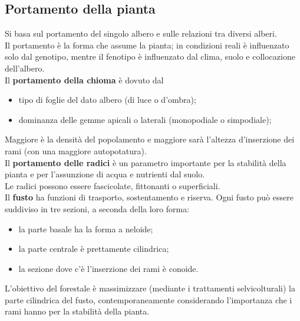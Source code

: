 \documentclass{article}
\begin{document}
\subsection{Portamento della pianta}
Si basa sul portamento del singolo albero e sulle relazioni tra diversi alberi.\\
Il portamento è la forma che assume la pianta; in condizioni reali è influenzato solo dal genotipo, mentre il fenotipo è influenzato dal clima, suolo e collocazione dell'albero.\\
Il \textbf{portamento della chioma} è dovuto dal 
\begin{itemize}
    \item tipo di foglie del dato albero (di luce o d'ombra);
    \item dominanza delle gemme apicali o laterali (monopodiale o simpodiale);
\end{itemize} 
Maggiore è la densità del popolamento e maggiore sarà l'altezza d'inserzione dei rami (con una maggiore autopotatura).\\
Il \textbf{portamento delle radici} è un parametro importante per la stabilità della pianta e per l'assunzione di acqua e nutrienti dal suolo.\\
Le radici possono essere fascicolate, fittonanti o superficiali.\\
Il \textbf{fusto} ha funzioni di trasporto, sostentamento e riserva. Ogni fusto può essere suddiviso in tre sezioni, a seconda della loro forma:
\begin{itemize}
    \item la parte basale ha la forma a neloide;
    \item la parte centrale è prettamente cilindrica;
    \item la sezione dove c'è l'inserzione dei rami è conoide.
\end{itemize}
L'obiettivo del forestale è massimizzare (mediante i trattamenti selvicolturali) la parte cilindrica del fusto, contemporaneamente considerando l'importanza che i rami hanno per la stabilità della pianta.\\
\end{document}
